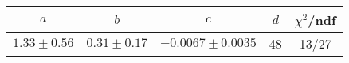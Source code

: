 \begin{tabular}{c|c|c|c|c}
$a$ & $b$ & $c$ & $d$ & $\chi^2$/ndf \\
\hline
$1.33\pm0.56$ & $0.31\pm0.17$ & $-0.0067\pm0.0035$ & 48 & 13/27
\end{tabular}
